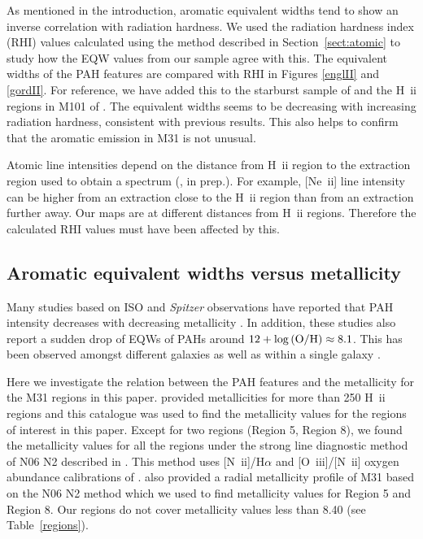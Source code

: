 As mentioned in the introduction, aromatic equivalent widths tend to show an inverse correlation with radiation hardness. We used the radiation hardness index (RHI) values calculated using the method described in Section~\ref{sect:atomic} to study how the EQW values from our sample agree with this.
The equivalent widths of the PAH features are compared with RHI in Figures \ref{englII} and \ref{gordII}.
For reference, we have added this to the starburst sample of \citet{Engelbracht_2008} and the H~{\sc ii} regions in M101 of \citet{Gordon:2008lr}. The equivalent widths seems to be decreasing with increasing radiation hardness, consistent with previous results. This also helps to confirm that the aromatic emission in M31 is not unusual. 

Atomic line intensities depend on the distance from H~{\sc ii} region to the extraction region used to obtain a spectrum (\citealt{Dave2014}, in prep.). 
For example, [Ne~{\sc ii}]  line intensity can be higher from an extraction close to the H~{\sc ii} region than from an extraction further away. 
Our maps are at different distances from H~{\sc ii} regions. Therefore the calculated RHI values must have been affected by this.

\subsection{Aromatic equivalent widths versus metallicity}
\label{sect:eqw_met}

Many studies based on ISO and {\em Spitzer} observations have reported that PAH intensity decreases with decreasing metallicity \citep{Calzetti:2010fk}. 
In addition, these studies also report a sudden drop of EQWs of PAHs around $12+\log{\rm (O/H)} \approx 8.1$. 
This has been observed amongst different galaxies \citep{Engelbracht_2008} as well as within a single galaxy \citep{Gordon:2008lr}. 

Here we investigate the relation between the PAH features and the metallicity for the M31 regions in this paper. 
\citet{Sanders_2011} provided metallicities for more than 250 H~{\sc ii} regions and this catalogue was used to find the metallicity values for 
the regions of interest in this paper. Except for two regions (Region 5, Region 8), we found the metallicity values for all the regions under the 
strong line diagnostic method of N06 N2 described in \citet{Sanders_2011}. This method uses  [N~{\sc ii}]/H$\alpha$ and  [O~{\sc iii}]/[N~{\sc ii}] 
oxygen abundance calibrations of \citealt{Nagao2006}. \citet{Sanders_2011} also provided a radial metallicity profile of M31 based on the N06 
N2 method which we used to find metallicity values for Region 5 and Region 8. Our regions do not cover metallicity values less than 8.40 (see Table~\ref{regions}).


